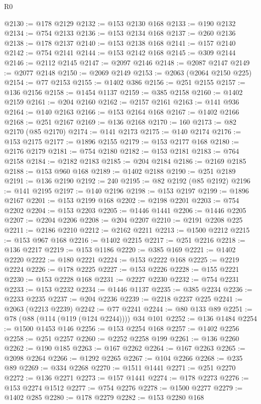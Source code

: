 \begin{lexlean}{R0}
\begin{coremodule}
@2130 := @178 @2129
@2132 := @153 @2130 @168
@2133 := @190 @2132
@2134 := @754 @2133
@2136 := @153 @2134 @168
@2137 := @260 @2136
@2138 := @178 @2137
@2140 := @153 @2138 @168
@2141 := @157 @2140
@2142 := @754 @2141
@2144 := @153 @2142 @168
@2145 := @309 @2144
@2146 := @2112 @2145
@2147 := @2097 @2146
@2148 := @2087 @2147
@2149 := @2077 @2148
@2150 := @2069 @2149
@2153 := @2063 (@2064 @2150 @225)
@2154 := @77 @2153
@2155 := @1402 @386
@2156 := @251 @2155
@2157 := @136 @2156
@2158 := @1454 @1137
@2159 := @385 @2158
@2160 := @1402 @2159
@2161 := @204 @2160
@2162 := @2157 @2161
@2163 := @141 @936
@2164 := @140 @2163
@2166 := @153 @2164 @168
@2167 := @1402 @2166
@2168 := @251 @2167
@2169 := @136 @2168
@2170 := 160
@2173 := @82 @2170 (@85 @2170)
@2174 := @141 @2173
@2175 := @140 @2174
@2176 := @153 @2175
@2177 := @1896 @2155
@2179 := @153 @2177 @168
@2180 := @2176 @2179
@2181 := @754 @2180
@2182 := @153 @2181
@2183 := @764 @2158
@2184 := @2182 @2183
@2185 := @204 @2184
@2186 := @2169 @2185
@2188 := @153 @960 @168
@2189 := @1402 @2188
@2190 := @251 @2189
@2191 := @136 @2190
@2192 := 240
@2195 := @82 @2192 (@85 @2192)
@2196 := @141 @2195
@2197 := @140 @2196
@2198 := @153 @2197
@2199 := @1896 @2167
@2201 := @153 @2199 @168
@2202 := @2198 @2201
@2203 := @754 @2202
@2204 := @153 @2203
@2205 := @1446 @1441
@2206 := @1446 @2205
@2207 := @2204 @2206
@2208 := @204 @2207
@2210 := @2191 @2208 @225
@2211 := @2186 @2210
@2212 := @2162 @2211
@2213 := @1500 @2212
@2215 := @153 @967 @168
@2216 := @1402 @2215
@2217 := @251 @2216
@2218 := @136 @2217
@2219 := @153 @1186
@2220 := @385 @169
@2221 := @1402 @2220
@2222 := @180 @2221
@2224 := @153 @2222 @168
@2225 := @2219 @2224
@2226 := @178 @2225
@2227 := @153 @2226
@2228 := @155 @2221
@2230 := @153 @2228 @168
@2231 := @2227 @2230
@2232 := @754 @2231
@2233 := @153 @2232
@2234 := @1446 @1137
@2235 := @385 @2234
@2236 := @2233 @2235
@2237 := @204 @2236
@2239 := @2218 @2237 @225
@2241 := @2063 (@2213 @2239)
@2242 := @77 @2241
@2244 := @80 @133 @89
@2251 := @78 (@88 (@114 (@119 (@124 @2244)))) @34 @101
@2252 := @136 @1484
@2254 := @1500 @1453 @146
@2256 := @153 @2254 @168
@2257 := @1402 @2256
@2258 := @251 @2257
@2260 := @2252 @2258 @199
@2261 := @136 @2260
@2262 := @190 @185
@2263 := @167 @2262
@2264 := @167 @2263
@2265 := @2098 @2264
@2266 := @1292 @2265
@2267 := @104 @2266
@2268 := @235 @89
@2269 := @334 @2268
@2270 := @1511 @1441
@2271 := @251 @2270
@2272 := @136 @2271
@2273 := @157 @1441
@2274 := @178 @2273
@2276 := @153 @2274 @1512
@2277 := @754 @2276
@2278 := @1500 @2277
@2279 := @1402 @285
@2280 := @178 @2279
@2282 := @153 @2280 @168

\end{coremodule}
\end{lexlean}

